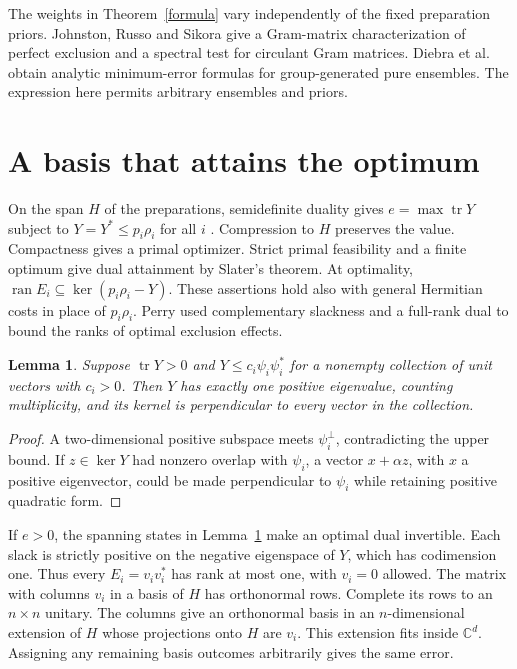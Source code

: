 \documentclass[11pt,a4paper]{article}
\newtheorem{lemma}[theorem]{Lemma}
\theoremstyle{remark}
\newcommand{\tr}{\operatorname{tr}}
\newcommand{\ran}{\operatorname{ran}}
\newcommand{\C}{\mathbb C}
\begin{document}
The weights in Theorem~\ref{formula} vary independently of the fixed preparation priors. Johnston, Russo and Sikora \cite{JRS} give a Gram-matrix characterization of perfect exclusion and a spectral test for circulant Gram matrices. Diebra et al.\ \cite{Diebra} obtain analytic minimum-error formulas for group-generated pure ensembles. The expression here permits arbitrary ensembles and priors.

\section{A basis that attains the optimum}

On the span \(H\) of the preparations, semidefinite duality gives \(e=\max\tr Y\) subject to \(Y=Y^*\le p_i\rho_i\) for all \(i\) \cite{Bandy}. Compression to \(H\) preserves the value. Compactness gives a primal optimizer. Strict primal feasibility and a finite optimum give dual attainment by Slater's theorem. At optimality, \(\ran E_i\subseteq\ker(p_i\rho_i-Y)\). These assertions hold also with general Hermitian costs in place of \(p_i\rho_i\). Perry \cite[App.~A.2]{Perry} used complementary slackness and a full-rank dual to bound the ranks of optimal exclusion effects.

\begin{lemma}\label{inertia}
Suppose \(\tr Y>0\) and \(Y\le c_i\psi_i\psi_i^*\) for a nonempty collection of unit vectors with \(c_i>0\). Then \(Y\) has exactly one positive eigenvalue, counting multiplicity, and its kernel is perpendicular to every vector in the collection.
\end{lemma}
\begin{proof}
A two-dimensional positive subspace meets \(\psi_i^\perp\), contradicting the upper bound. If \(z\in\ker Y\) had nonzero overlap with \(\psi_i\), a vector \(x+\alpha z\), with \(x\) a positive eigenvector, could be made perpendicular to \(\psi_i\) while retaining positive quadratic form.
\end{proof}

If \(e>0\), the spanning states in Lemma~\ref{inertia} make an optimal dual invertible. Each slack is strictly positive on the negative eigenspace of \(Y\), which has codimension one. Thus every \(E_i=v_iv_i^*\) has rank at most one, with \(v_i=0\) allowed. The matrix with columns \(v_i\) in a basis of \(H\) has orthonormal rows. Complete its rows to an \(n\times n\) unitary. The columns give an orthonormal basis in an \(n\)-dimensional extension of \(H\) whose projections onto \(H\) are \(v_i\). This extension fits inside \(\C^d\). Assigning any remaining basis outcomes arbitrarily gives the same error.
\end{document}

